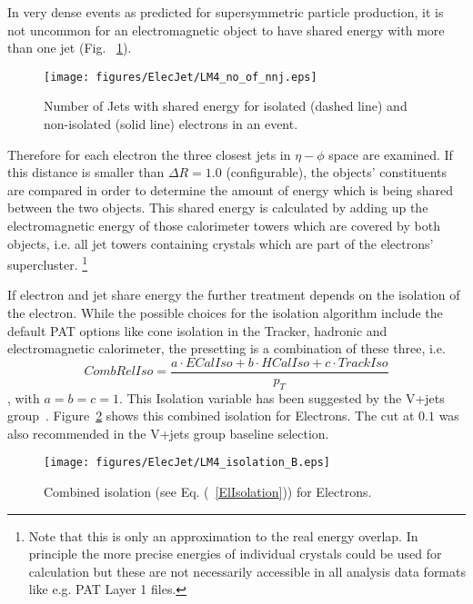 \documentclass{cmspaper}
\begin{document}
In very dense events as predicted for supersymmetric particle production, it is
not uncommon for an electromagnetic object to have shared energy with more than
one jet (Fig. ~\ref{fig:NbJets}).

\begin{figure}[hbtp]
  \begin{center}
    \texttt{[image: figures/ElecJet/LM4\_no\_of\_nnj.eps]}
    \caption{Number of Jets with shared energy for isolated (dashed line) and
    non-isolated (solid line) electrons in an event.}
    \label{fig:NbJets}
  \end{center}
\end{figure}

Therefore for each electron the three closest jets in \( \eta-\phi\) space are
examined. If this distance is smaller than $\Delta R=1.0$ (configurable), the
objects' constituents are compared in order to determine the amount of energy
which is being shared between the two objects.
This shared energy is calculated by adding up the electromagnetic energy of
those calorimeter towers which are covered by both objects, i.e. all jet towers
containing crystals which are part of the electrons' supercluster.
\footnote{Note that this is only an approximation to the real energy overlap.
In principle the more precise energies of individual crystals could be used for
calculation but these are not necessarily accessible in all analysis data
formats like e.g. PAT Layer 1 files.}

If electron and jet share energy the further treatment depends on the isolation
of the electron. While the possible choices for the isolation algorithm include
the default PAT options like cone isolation in the Tracker, hadronic and
electromagnetic calorimeter, the presetting is a combination of these three,
i.e. 
\begin{equation}
    CombRelIso=\frac{a\cdot ECalIso+b\cdot HCalIso+c\cdot TrackIso}{p_T}
    \label{ElIsolation}
\end{equation}
, with \(a=b=c=1\). This Isolation variable has been suggested by the V+jets
group~\cite{vplusjets}. Figure~\ref{fig:ElectronIsolation} shows this combined
isolation for Electrons. The cut at \(0.1\) was also recommended in the V+jets
group baseline selection.

\begin{figure}[hbtp]
  \begin{center}
    \texttt{[image: figures/ElecJet/LM4\_isolation\_B.eps]}
    \caption{Combined isolation (see Eq. (~\ref{ElIsolation})) for Electrons.}
    \label{fig:ElectronIsolation}
  \end{center}
\end{figure}
\end{document}
